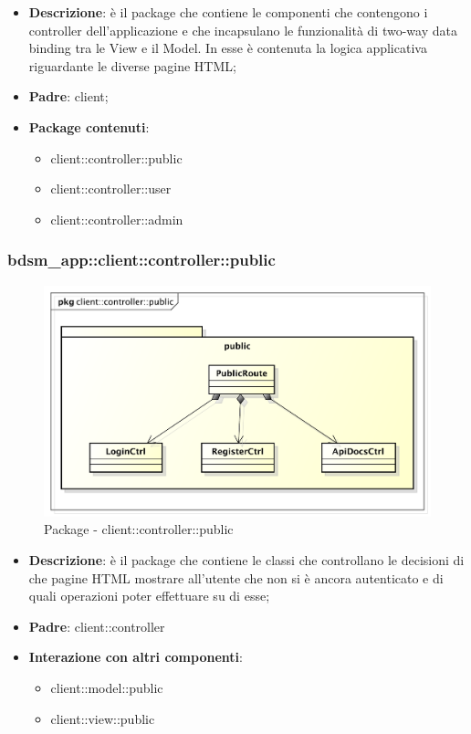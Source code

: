\begin{itemize}
	\item \textbf{Descrizione}: è il package che contiene le componenti che contengono i controller dell'applicazione e che incapsulano le funzionalità di two-way data binding tra le View e il Model. In esse è contenuta la logica applicativa riguardante le diverse pagine HTML;
	\item \textbf{Padre}: client;
	\item \textbf{Package contenuti}:
		\begin{itemize}
			\item client::controller::public
			\item client::controller::user
			\item client::controller::admin
		\end{itemize}
\end{itemize}


\subsubsection{bdsm\_app::client::controller::public} %
\label{ssub:bdsm_app_client_controller_public}
\begin{figure}[htbp]
	\centering
	\centerline{\includegraphics[scale=0.6]{./images/client_controller_public.pdf}}
	\caption{Package - client::controller::public}
\end{figure}

\begin{itemize}
	\item \textbf{Descrizione}: è il package che contiene le classi che controllano le decisioni di che pagine HTML mostrare all'utente che non si è ancora autenticato e di quali operazioni poter effettuare su di esse;
	\item \textbf{Padre}: client::controller
	\item \textbf{Interazione con altri componenti}:
		\begin{itemize}
			\item client::model::public
			\item client::view::public
		\end{itemize}
\end{itemize}

